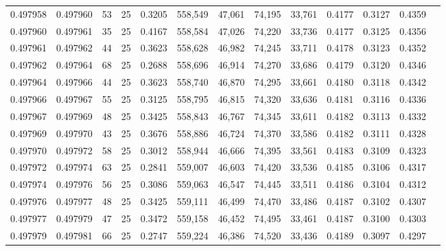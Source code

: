 \begin{tabular}{rrrrrrrrrrrrr}
0.497958 & 0.497960 &    53 &  25 &                                     0.3205 & 558,549 &  47,061 &  74,195 &  33,761 & 0.4177 & 0.3127 & 0.4359 \\
0.497960 & 0.497961 &    35 &  25 &                                     0.4167 & 558,584 &  47,026 &  74,220 &  33,736 & 0.4177 & 0.3125 & 0.4356 \\
0.497961 & 0.497962 &    44 &  25 &                                     0.3623 & 558,628 &  46,982 &  74,245 &  33,711 & 0.4178 & 0.3123 & 0.4352 \\
0.497962 & 0.497964 &    68 &  25 &                                     0.2688 & 558,696 &  46,914 &  74,270 &  33,686 & 0.4179 & 0.3120 & 0.4346 \\
0.497964 & 0.497966 &    44 &  25 &                                     0.3623 & 558,740 &  46,870 &  74,295 &  33,661 & 0.4180 & 0.3118 & 0.4342 \\
0.497966 & 0.497967 &    55 &  25 &                                     0.3125 & 558,795 &  46,815 &  74,320 &  33,636 & 0.4181 & 0.3116 & 0.4336 \\
0.497967 & 0.497969 &    48 &  25 &                                     0.3425 & 558,843 &  46,767 &  74,345 &  33,611 & 0.4182 & 0.3113 & 0.4332 \\
0.497969 & 0.497970 &    43 &  25 &                                     0.3676 & 558,886 &  46,724 &  74,370 &  33,586 & 0.4182 & 0.3111 & 0.4328 \\
0.497970 & 0.497972 &    58 &  25 &                                     0.3012 & 558,944 &  46,666 &  74,395 &  33,561 & 0.4183 & 0.3109 & 0.4323 \\
0.497972 & 0.497974 &    63 &  25 &                                     0.2841 & 559,007 &  46,603 &  74,420 &  33,536 & 0.4185 & 0.3106 & 0.4317 \\
0.497974 & 0.497976 &    56 &  25 &                                     0.3086 & 559,063 &  46,547 &  74,445 &  33,511 & 0.4186 & 0.3104 & 0.4312 \\
0.497976 & 0.497977 &    48 &  25 &                                     0.3425 & 559,111 &  46,499 &  74,470 &  33,486 & 0.4187 & 0.3102 & 0.4307 \\
0.497977 & 0.497979 &    47 &  25 &                                     0.3472 & 559,158 &  46,452 &  74,495 &  33,461 & 0.4187 & 0.3100 & 0.4303 \\
0.497979 & 0.497981 &    66 &  25 &                                     0.2747 & 559,224 &  46,386 &  74,520 &  33,436 & 0.4189 & 0.3097 & 0.4297 \\

\end{tabular}
